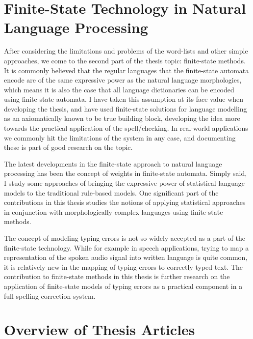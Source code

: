 \documentclass[officiallayout]{unihelcompling}
\begin{document}
\section{Finite-State Technology in Natural Language Processing}
\label{sec:finite-state-technology-in-nlp}

After considering the limitations and problems of the word-lists and other
simple approaches, we come to the second part of the thesis topic: finite-state
methods.  It is commonly believed that the regular languages that the
finite-state automata encode are of the same expressive power as the natural
language morphologies, which means it is also the case that all language
dictionaries can be encoded using finite-state automata. I have taken this
assumption at its face value when developing the thesis, and have used
finite-state solutions for language modelling as an axiomatically known to be
true building block, developing the idea more towards the practical application
of the spell\-/checking. In real-world applications we commonly hit the
limitations of the system in any case, and documenting these is part of good
research on the topic.

The latest developments in the finite-state approach to natural language
processing has been the concept of weights in finite-state automata.  Simply
said, I study some approaches of bringing the expressive power of statistical
language models to the traditional rule-based models. One significant part of
the contributions in this thesis studies the notions of applying statistical
approaches in conjunction with morphologically complex languages using
finite-state methods.

The concept of modeling typing errors is not so widely accepted as a part of
the finite-state technology. While for example in speech applications,
trying to map a representation of the spoken audio signal into written language
is quite common, it is relatively new in the mapping of typing errors to
correctly typed text. The contribution to finite-state methods in this thesis
is further research on the application of finite-state models of typing errors
as a practical component in a full spelling correction system.


\section{Overview of Thesis Articles}
\label{sec:articles}
\end{document}
